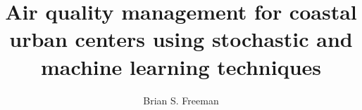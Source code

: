 
\title{Air quality management for coastal urban centers using stochastic and machine learning techniques}
\author{Brian S. Freeman}
%
%
%
%
\chair{  }
%
\othermembers{ }
%
%
%


\maketitle



